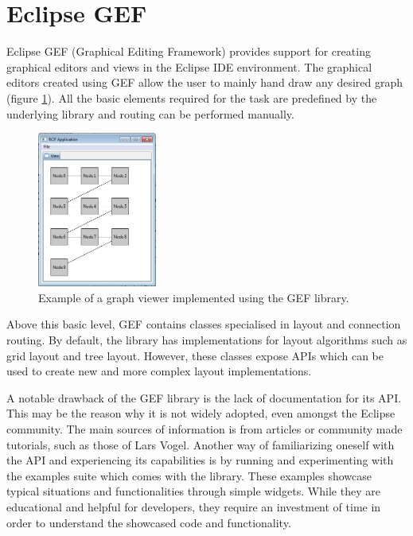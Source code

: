 \section{Eclipse GEF}

Eclipse GEF (Graphical Editing Framework) provides support for creating graphical editors and views in the Eclipse IDE environment\cite{eclipse2007relwork}. The graphical 
editors created using GEF allow the user to mainly hand draw any desired graph (figure \ref{gef}). All the basic elements required for the task are predefined 
by the underlying library and routing can be performed manually.

\begin{figure}[ht] \centering
\includegraphics[width=0.35\textwidth]{img/relatedwork/gefexample.jpg}
\caption{Example of a graph viewer implemented using the GEF library.\protect\footnotemark \label{gef}} \end{figure}

Above this basic level, GEF contains classes specialised in layout and connection routing. By default, the library has implementations for 
layout algorithms such as grid layout and tree layout. However, these classes expose APIs which can be used to create new and more complex 
layout implementations.

A notable drawback of the GEF library is the lack of documentation for its API. This may be the reason why it is not widely 
adopted, even amongst the Eclipse community. The main sources of information is from articles or community made tutorials, such as 
those of Lars Vogel\cite{vogel2014contributing}. Another way of familiarizing oneself with the API and experiencing its capabilities is by running and experimenting 
with the examples suite which comes with the library. These examples showcase typical situations and functionalities through 
simple widgets. While they are educational and helpful for developers, they require an investment of time in order to understand 
the showcased code and functionality.

